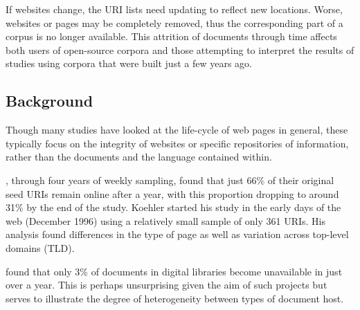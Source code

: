 If websites change, the URI lists need updating to reflect new locations. 
Worse, websites or pages may be completely removed, thus the corresponding part of a corpus is no longer available.
This attrition of documents through time affects both users of open-source corpora 
and those attempting to interpret the results of studies using corpora that were built just a few years ago.

\subsection{Background}
Though many studies have looked at the life-cycle of web pages in general, these typically focus on the integrity of websites or specific repositories of information, rather than the documents and the language contained within.



\cite{koehler2002web}, through four years of weekly sampling, found that just 66\% of their original seed URIs remain online after a year, with this proportion dropping to around 31\% by the end of the study.  Koehler started his study in the early days of the web (December 1996) using a relatively small sample of only 361 URIs.  His analysis found differences in the type of page as well as variation across top-level domains (TLD). %

\cite{nelson2002object} found that only 3\% of documents in digital libraries become unavailable in just over a year. This is perhaps unsurprising given the aim of such projects but serves to illustrate the degree of heterogeneity between types of document host.  




